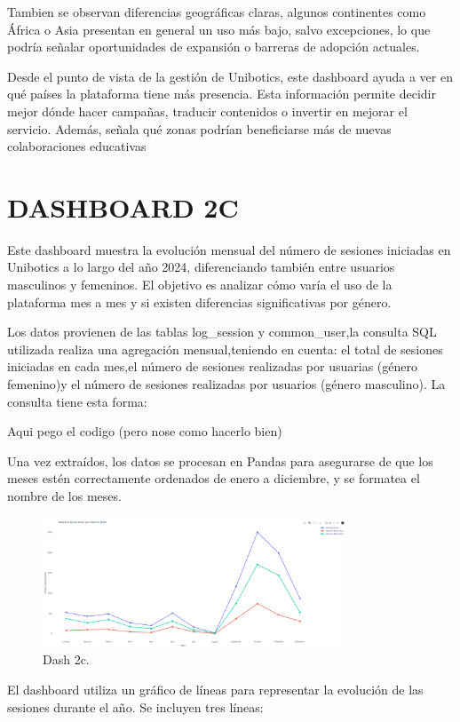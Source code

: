 \documentclass[a4paper, 12pt]{book}
\begin{document}
Tambien se observan diferencias geográficas claras, algunos continentes como África o Asia presentan en general un uso más bajo, salvo excepciones, lo que podría señalar oportunidades de expansión o barreras de adopción actuales.

Desde el punto de vista de la gestión de Unibotics, este dashboard ayuda a ver en qué países la plataforma tiene más presencia. Esta información permite decidir mejor dónde hacer campañas, traducir contenidos o invertir en mejorar el servicio. Además, señala qué zonas podrían beneficiarse más de nuevas colaboraciones educativas

\section{DASHBOARD 2C}

Este dashboard muestra la evolución mensual del número de sesiones iniciadas en Unibotics a lo largo del año 2024, diferenciando también entre usuarios masculinos y femeninos. El objetivo es analizar cómo varía el uso de la plataforma mes a mes y si existen diferencias significativas por género.

Los datos provienen de las tablas log\_session y common\_user,la consulta SQL utilizada realiza una agregación mensual,teniendo en cuenta: el total de sesiones iniciadas en cada mes,el número de sesiones realizadas por usuarias (género femenino)y el número de sesiones realizadas por usuarios (género masculino).
La consulta tiene esta forma:

Aqui pego el codigo (pero nose como hacerlo bien)

Una vez extraídos, los datos se procesan en Pandas para asegurarse de que los meses estén correctamente ordenados de enero a diciembre, y se formatea el nombre de los meses.


\begin{figure}
  \centering
  \includegraphics[width=9cm, keepaspectratio]{img/2c.png}
  \caption{Dash 2c.}\label{fig:2c}
\end{figure}
El dashboard utiliza un gráfico de líneas para representar la evolución de las sesiones durante el año. Se incluyen tres líneas:
\end{document}
